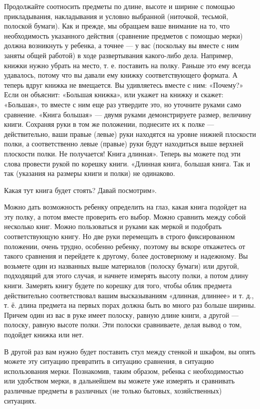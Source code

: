\documentclass[a5paper]{book}
\begin{document}
Продолжайте соотносить предметы по длине, высоте и ширине с помощью
прикладывания, накладывания и условно выбранной (ниточкой, тесьмой,
полоской бумаги). Как и прежде, мы обращаем ваше внимание на то, что
необходимость указанного действия (сравнение предметов с помощью мерки)
должна возникнуть у ребенка, а точнее --- у вас (поскольку вы вместе с
ним заняты общей работой) в ходе развертывания какого-либо дела.
Например, книжки нужно убрать на место, т. е. поставить на полку. Раньше
это ему всегда удавалось, потому что вы давали ему книжку
соответствующего формата. А теперь вдруг книжка не вмещается. Вы
удивляетесь вместе с ним: «Почему?» Если он объяснит: «Большая книжка»,
или укажет на книжку и скажет: «Большая», то вместе с ним еще раз
утвердите это, но уточните руками само сравнение. «Книга большая» ---
двумя руками демонстрируете размер, величину книги. Сохраняя руки в том
же положении, поднесите их к полке --- действительно, ваши правые
(левые) руки находятся на уровне нижней плоскости полки, а
соответственно левые (правые) руки будут находиться выше верхней
плоскости полки. Не получается! Книга длинная». Теперь вы можете под эти
слова провести рукой по корешку книги. «Длинная книга, большая книга.
Так и так (указания на размеры книги и полки) не одинаково.

Какая тут книга будет стоять? Давай посмотрим».

Можно дать возможность ребенку определить на глаз, какая книга подойдет
на эту полку, а потом вместе проверить его выбор. Можно сравнить между
собой несколько книг. Можно пользоваться и руками как меркой и подобрать
соответствующую книгу. Но две руки перемещать в строго фиксированном
положении, очень трудно, особенно ребенку, поэтому вы вскоре откажетесь
от такого сравнения и перейдете к другому, более достоверному и
надежному. Вы возьмете один из названных выше материалов (полоску
бумаги) или другой, подходящий для этого случая, и начнете измерять
высоту полки, а потом длину книги. Замерять книгу будете по корешку для
того, чтобы облик предмета действительно соответствовал вашим
высказываниям «длинная, длиннее» и т. д., т. ё. длина предмета на первых
порах должна быть во много раз больше ширины. Причем один из вас в руке
имеет полоску, равную длине книги, а другой --- полоску, равную высоте
полки. Эти полоски сравниваете, делая вывод о том, подойдет книжка или
нет.

В другой раз вам нужно будет поставить стул между стенкой и шкафом, вы
опять можете эту ситуацию превратить в ситуацию сравнения, в ситуацию
использования мерки. Познакомив, таким образом, ребенка с необходимостью
или удобством мерки, в дальнейшем вы можете уже измерять и сравнивать
различные предметы в различных (не только бытовых, хозяйственных)
ситуациях.
\end{document}
